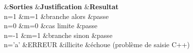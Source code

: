
\begin{DoxyRefList}
\item[\label{test__test000001}%
\hypertarget{test__test000001}{}%
Membre \hyperlink{tp1-1_8cpp_ae66f6b31b5ad750f1fe042a706a4e3d4}{main} ()]\begin{TabularC}{4}
\hline
{}&{\bf Sorties }&{\bf Justification }&{\bf Resultat  }\\
n=1 &m=1 &branche alors &passe \\
n=0 &m=0 &cas limite &passe \\
n=-\/1 &m=1 &branche sinon &passe \\
n='a' &E\+R\+R\+E\+U\+R &illicite &échoue (problème de saisie C++) \\
\end{TabularC}

\end{DoxyRefList}